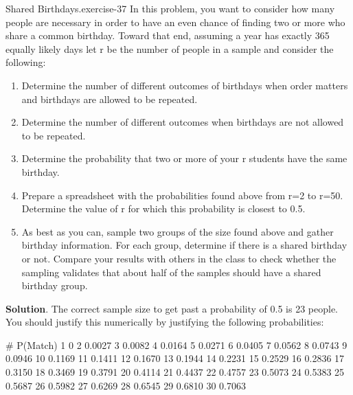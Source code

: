 \documentclass[10pt,]{book}
\numberwithin{equation}{section}
\begin{document}
%
\par
\hypertarget{p-611}{}%
\begin{inlineexercise}{Shared Birthdays.}{exercise-37}%
\hypertarget{p-612}{}%
In this problem, you want to consider how many people are necessary in order to have an even chance of finding two or more who share a common birthday. Toward that end, assuming a year has exactly 365 equally likely days let r be the number of people in a sample and consider the following: \leavevmode%
\begin{enumerate}
\item\hypertarget{li-168}{}Determine the number of different outcomes of birthdays when order matters and birthdays are allowed to be repeated.%
\item\hypertarget{li-169}{}Determine the number of different outcomes when birthdays are not allowed to be repeated.%
\item\hypertarget{li-170}{}Determine the probability that two or more of your r students have the same birthday.%
\item\hypertarget{li-171}{}Prepare a spreadsheet with the probabilities found above from r=2 to r=50. Determine the value of r for which this probability is closest to 0.5.%
\item\hypertarget{li-172}{}As best as you can, sample two groups of the size found above and gather birthday information. For each group, determine if there is a shared birthday or not.  Compare your results with others in the class to check whether the sampling validates that about half of the samples should have a shared birthday group.%
\end{enumerate}
%
\par\smallskip%
\noindent\textbf{Solution}.\hypertarget{solution-15}{}\quad%
\hypertarget{p-613}{}%
The correct sample size to get past a probability of 0.5 is 23 people. You should justify this numerically by justifying the following probabilities:\begin{preformatted}
#	P(Match)	
1	0
2	0.0027
3	0.0082
4	0.0164
5	0.0271
6	0.0405
7	0.0562
8	0.0743
9	0.0946
10	0.1169
11	0.1411
12	0.1670
13	0.1944
14	0.2231
15	0.2529
16	0.2836
17	0.3150
18	0.3469
19	0.3791
20	0.4114
21	0.4437
22	0.4757
23	0.5073
24	0.5383
25	0.5687
26	0.5982
27	0.6269
28	0.6545
29	0.6810
30	0.7063
\end{preformatted}
%
\end{inlineexercise}
%
\par
\hypertarget{p-614}{}%
\end{document}
